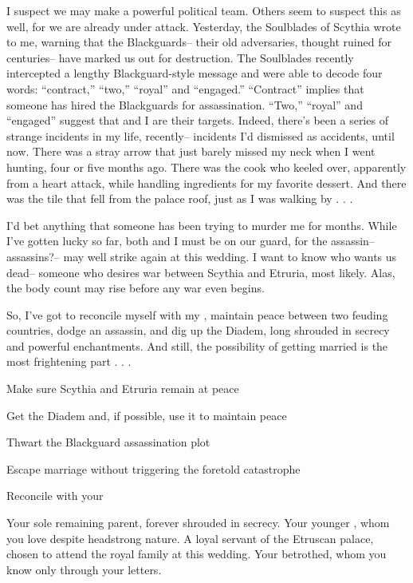 \documentclass[char]{Kos}
\begin{document}
I suspect we may make a powerful political team. Others seem to suspect this as well, for we are already under attack. Yesterday, the Soulblades of Scythia wrote to me, warning that the Blackguards-- their old adversaries, thought ruined for centuries-- have marked us out for destruction. The Soulblades recently intercepted a lengthy Blackguard-style message and were able to decode four words: ``contract,'' ``two,'' ``royal'' and ``engaged.'' ``Contract'' implies that someone has hired the Blackguards for assassination. ``Two,'' ``royal'' and ``engaged'' suggest that \cBride{} and I are their targets. Indeed, there's been a series of strange incidents in my life, recently-- incidents I'd dismissed as accidents, until now. There was a stray arrow that just barely missed my neck when I went hunting, four or five months ago. There was the cook who keeled over, apparently from a heart attack, while handling ingredients for my favorite dessert. And there was the tile that fell from the palace roof, just as I was walking by . . . 

I'd bet anything that someone has been trying to murder me for months. While I've gotten lucky so far, both \cBride{} and I must be on our guard, for the assassin-- assassins?-- may well strike again at this wedding. I want to know who wants us dead-- someone who desires war between Scythia and Etruria, most likely. Alas, the body count may rise before any war even begins. 

So, I've got to reconcile myself with my \cPoet{\sibling}, maintain peace between two feuding countries, dodge an assassin, and dig up the Diadem, long shrouded in secrecy and powerful enchantments. And still, the possibility of getting married is the most frightening part . . .

\begin{itemz}[Goals]
 \item Make sure Scythia and Etruria remain at peace
 \item Get the Diadem and, if possible, use it to maintain peace
 \item Thwart the Blackguard assassination plot 
 \item Escape marriage without triggering the foretold catastrophe
 \item Reconcile with your \cPoet{\sibling}
\end{itemz}

\begin{contacts}
\contact{\cEtruriaKing{}} Your sole remaining parent, forever shrouded in secrecy.
\contact{\cPoet{}} Your younger \cPoet{\sibling}, whom you love despite \cPoet{\their} headstrong nature.
\contact{\cAssassin{}} A loyal servant of the Etruscan palace, chosen to attend the royal family at this wedding.
\contact{\cBride{}} Your betrothed, whom you know only through your letters.
\end{contacts} 
\end{document}
